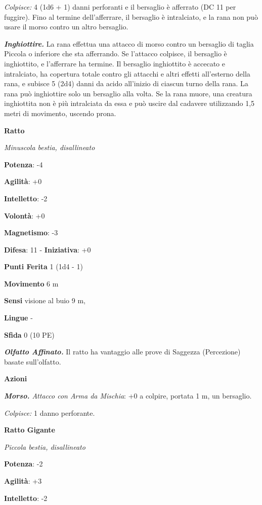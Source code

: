 \begin{multicols}{2}
\emph{Colpisce:} 4 (1d6 + 1) danni perforanti e il bersaglio è afferrato
(DC 11 per fuggire). Fino al termine dell'afferrare, il bersaglio è
intralciato, e la rana non può usare il morso contro un altro bersaglio.

\emph{\textbf{Inghiottire.}} La rana effettua una attacco di morso
contro un bersaglio di taglia Piccola o inferiore che sta afferrando. Se
l'attacco colpisce, il bersaglio è inghiottito, e l'afferrare ha
termine. Il bersaglio inghiottito è accecato e intralciato, ha copertura
totale contro gli attacchi e altri effetti all'esterno della rana, e
subisce 5 (2d4) danni da acido all'inizio di ciascun turno della rana.
La rana può inghiottire solo un bersaglio alla volta. Se la rana muore,
una creatura inghiottita non è più intralciata da essa e può uscire dal
cadavere utilizzando 1,5 metri di movimento, uscendo prona.



\textbf{Ratto}

\emph{Minuscola bestia, disallineato}

\textbf{Potenza}: -4

\textbf{Agilità}: +0

\textbf{Intelletto}: -2

\textbf{Volontà}: +0

\textbf{Magnetismo}: -3

\textbf{Difesa}: 11 - \textbf{Iniziativa}: +0

\textbf{Punti Ferita} 1 (1d4 - 1)

\textbf{Movimento} 6 m

\textbf{Sensi} visione al buio 9 m, 

\textbf{Lingue} -

\textbf{Sfida} 0 (10 PE)\smallskip

\emph{\textbf{Olfatto Affinato.}} Il ratto ha vantaggio alle prove di
Saggezza (Percezione) basate sull'olfatto.

\smallskip\textbf{Azioni}

\emph{\textbf{Morso.} Attacco con Arma da Mischia}: +0 a colpire,
portata 1 m, un bersaglio.

\emph{Colpisce:} 1 danno perforante.

\textbf{Ratto Gigante}

\emph{Piccola bestia, disallineato}

\textbf{Potenza}: -2

\textbf{Agilità}: +3

\textbf{Intelletto}: -2


\end{multicols}
